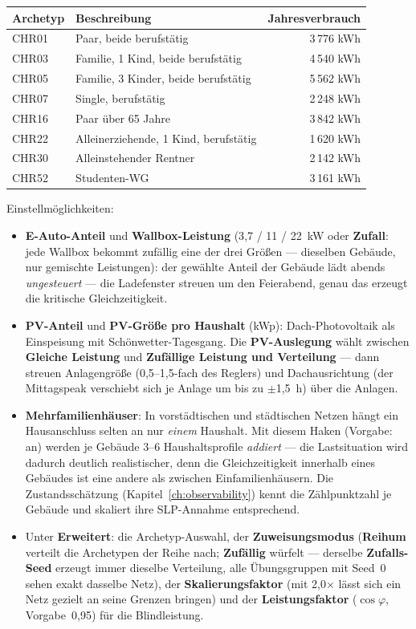 \documentclass[11pt,a4paper,parskip=half]{scrreprt}
\newcommand{\ui}[1]{\textsf{\bfseries #1}}          %
\begin{document}
\begin{center}
\begin{tabular}{@{}llr@{}}
\toprule
Archetyp & Beschreibung & Jahresverbrauch \\
\midrule
CHR01 & Paar, beide berufstätig & 3\,776 kWh \\
CHR03 & Familie, 1 Kind, beide berufstätig & 4\,540 kWh \\
CHR05 & Familie, 3 Kinder, beide berufstätig & 5\,562 kWh \\
CHR07 & Single, berufstätig & 2\,248 kWh \\
CHR16 & Paar über 65 Jahre & 3\,842 kWh \\
CHR22 & Alleinerziehende, 1 Kind, berufstätig & 1\,620 kWh \\
CHR30 & Alleinstehender Rentner & 2\,142 kWh \\
CHR52 & Studenten-WG & 3\,161 kWh \\
\bottomrule
\end{tabular}
\end{center}

Einstellmöglichkeiten:

\begin{itemize}[nosep]
  \item \ui{E-Auto-Anteil} und \ui{Wallbox-Leistung} (3{,}7 / 11 /
    22~kW oder \ui{Zufall}: jede Wallbox bekommt zufällig eine der
    drei Größen --- dieselben Gebäude, nur gemischte Leistungen):
    der gewählte Anteil der Gebäude lädt abends \emph{ungesteuert}
    --- die Ladefenster streuen um den Feierabend, genau das
    erzeugt die kritische Gleichzeitigkeit.
  \item \ui{PV-Anteil} und \ui{PV-Größe pro Haushalt} (kWp):
    Dach-Photovoltaik als Einspeisung mit Schönwetter-Tagesgang.
    Die \ui{PV-Auslegung} wählt zwischen \ui{Gleiche Leistung} und
    \ui{Zufällige Leistung und Verteilung} --- dann streuen
    Anlagengröße (0{,}5--1{,}5-fach des Reglers) und Dachausrichtung
    (der Mittagspeak verschiebt sich je Anlage um bis zu
    $\pm$1{,}5~h) über die Anlagen.
  \item \ui{Mehrfamilienhäuser}: In vorstädtischen und städtischen
    Netzen hängt ein Hausanschluss selten an nur \emph{einem}
    Haushalt. Mit diesem Haken (Vorgabe: an) werden je Gebäude
    3--6 Haushaltsprofile \emph{addiert} --- die Lastsituation wird
    dadurch deutlich realistischer, denn die Gleichzeitigkeit
    innerhalb eines Gebäudes ist eine andere als zwischen
    Einfamilienhäusern. Die Zustandsschätzung
    (Kapitel~\ref{ch:observability}) kennt die Zählpunktzahl je
    Gebäude und skaliert ihre SLP-Annahme entsprechend.
  \item Unter \ui{Erweitert}: die Archetyp-Auswahl, der
    \ui{Zuweisungsmodus} (\ui{Reihum} verteilt die Archetypen der
    Reihe nach; \ui{Zufällig} würfelt --- derselbe \ui{Zufalls-Seed}
    erzeugt immer dieselbe Verteilung, alle Übungsgruppen mit
    Seed~0 sehen exakt dasselbe Netz), der \ui{Skalierungsfaktor}
    (mit 2{,}0$\times$ lässt sich ein Netz gezielt an seine Grenzen
    bringen) und der \ui{Leistungsfaktor} ($\cos\varphi$,
    Vorgabe~0{,}95) für die Blindleistung.
\end{itemize}
\end{document}
